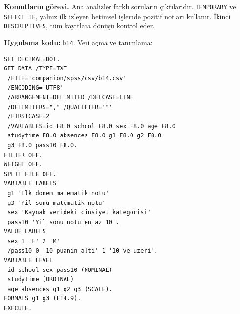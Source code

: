 \begin{spssadimlar}
\end{spssadimlar}

{\raggedright
\noindent\textbf{Komutların görevi.} Ana analizler farklı soruların
çıktılarıdır. \texttt{TEMPORARY} ve \texttt{SELECT IF}, yalnız ilk
izleyen betimsel işlemde pozitif notları kullanır. İkinci
\texttt{DESCRIPTIVES}, tüm kayıtlara dönüşü kontrol eder.\par}

\par\noindent\begin{minipage}{\linewidth}
\textbf{Uygulama kodu:} \texttt{b14}. Veri açma ve tanımlama:

\begin{lstlisting}[style=prismSPSS]
SET DECIMAL=DOT.
GET DATA /TYPE=TXT
 /FILE='companion/spss/csv/b14.csv'
 /ENCODING='UTF8'
 /ARRANGEMENT=DELIMITED /DELCASE=LINE
 /DELIMITERS="," /QUALIFIER='"'
 /FIRSTCASE=2
 /VARIABLES=id F8.0 school F8.0 sex F8.0 age F8.0
 studytime F8.0 absences F8.0 g1 F8.0 g2 F8.0
 g3 F8.0 pass10 F8.0.
FILTER OFF.
WEIGHT OFF.
SPLIT FILE OFF.
VARIABLE LABELS
 g1 'Ilk donem matematik notu'
 g3 'Yil sonu matematik notu'
 sex 'Kaynak verideki cinsiyet kategorisi'
 pass10 'Yil sonu notu en az 10'.
VALUE LABELS
 sex 1 'F' 2 'M'
 /pass10 0 '10 puanin alti' 1 '10 ve uzeri'.
VARIABLE LEVEL
 id school sex pass10 (NOMINAL)
 studytime (ORDINAL)
 age absences g1 g2 g3 (SCALE).
FORMATS g1 g3 (F14.9).
EXECUTE.
\end{lstlisting}
\end{minipage}\par


